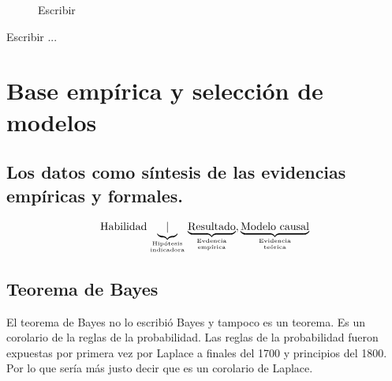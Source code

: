 \documentclass[a4paper,10pt]{book}
\begin{document}
\begin{figure}[H]
 \centering
{} 
\caption{Escribir}
\label{fig:monty_hall_condicional}
\end{figure}

Escribir ...



 
\section{Base empírica y selección de modelos}



\subsection{Los datos como síntesis de las evidencias empíricas y formales.}
%
\begin{align*} \normalsize
\text{Habilidad} \underbrace{|}_{\hfrac{\text{Hipótesis}}{\text{indicadora}}} \underbrace{\text{Resultado}}_{\hfrac{\text{Evdencia}}{\text{empírica}}}, \underbrace{\text{Modelo causal}}_{\hfrac{\text{Evidencia}}{\text{teórica}}}
\end{align*}



\subsection{Teorema de Bayes}

El teorema de Bayes no lo escribió Bayes y tampoco es un teorema.
Es un corolario de la reglas de la probabilidad.
Las reglas de la probabilidad fueron expuestas por primera vez por Laplace a finales del 1700 y principios del 1800.
Por lo que sería más justo decir que es un corolario de Laplace.
\end{document}
